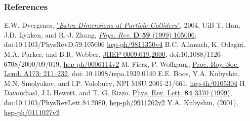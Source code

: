 \documentclass[10pt]{beamer}
\begin{document}
	\begin{frame}
		\frametitle{References}
		\begin{thebibliography}{9}
			E.W. Dvergsnes, \href{http://bora.uib.no/bitstream/handle/1956/847/THESIS.pdf?sequence=1}{"\emph{Extra Dimensions at Particle Colliders}"}, 2004, UiB
			T. Han, J.D. Lykken, and R.-J. Zhang,
			\href{http://journals.aps.org/prd/abstract/10.1103/PhysRevD.59.105006}{\emph{Phys. Rev.} {\bfseries D 59} (1999) 105006}, doi:10.1103/PhysRevD.59.105006 \href{http://xxx.lanl.gov/abs/hep-ph/9811350v4}{hep-ph/9811350v4}
			B.C. Allanach, K. Odagiri, M.A. Parker, and B.R. Webber,
			\href{http://iopscience.iop.org/article/10.1088/1126-6708/2000/09/019/meta;jsessionid=8B906F8B155A00E75050CBB02B18326C.c4.iopscience.cld.iop.org}{JHEP 0009:019,2000}, doi:10.1088/1126-6708/2000/09/019, \href{http://arxiv.org/abs/hep-ph/0006114v2}{hep-ph/0006114v2}
			M. Fierz, P. Wolfgang, \href{http://rspa.royalsocietypublishing.org/content/173/953/211}{Proc. Roy. Soc. Lond. A173: 211–232}, doi: 10.1098/rspa.1939.0140
			E.E. Boos, Y.A. Kubyshin, M.N. Smolyakov, and I.P. Volobuev, NPI MSU 2001-21/661, \href{http://arxiv.org/abs/hep-th/0105304}{hep-th/0105304}
			H. Davoudiasl, J.L Hewett, and T. G. Rizzo, \href{http://journals.aps.org/prl/abstract/10.1103/PhysRevLett.84.2080}{Phys. Rev. Lett. $\bm{84}$ 3370 (1999)}, doi:10.1103/PhysRevLett.84.2080, \href{http://arxiv.org/pdf/hep-ph/9911262v2.pdf}{hep-ph/9911262v2}
			Y.A. Kubyshin, (2001), \href{http://arxiv.org/abs/hep-ph/0111027v2}{hep-ph/0111027v2}
		\end{thebibliography}
	\end{frame}
\end{document}

